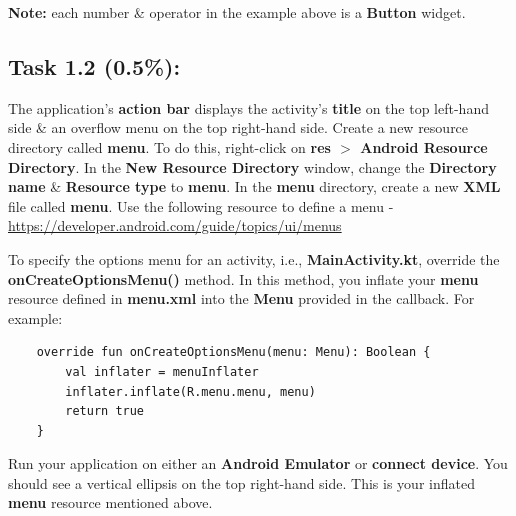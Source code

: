 \documentclass{article}
\begin{document}
\textbf{Note:} each number \& operator in the example above is a \textbf{Button} widget.

\subsection*{Task 1.2 (0.5\%):} 
The application's \textbf{action bar} displays the activity's \textbf{title} on the top left-hand side \& an overflow menu on the top right-hand side. Create a new resource directory called \textbf{menu}. To do this, right-click on \textbf{res $>$ Android Resource Directory}. In the \textbf{New Resource Directory} window, change the \textbf{Directory name} \& \textbf{Resource type} to \textbf{menu}. In the \textbf{menu} directory, create a new \textbf{XML} file called \textbf{menu}. Use the following resource to define a menu - \href{https://developer.android.com/guide/topics/ui/menus}{https://developer.android.com/guide/topics/ui/menus}

To specify the options menu for an activity, i.e., \textbf{MainActivity.kt}, override the \textbf{onCreateOptionsMenu()} method. In this method, you inflate your \textbf{menu} resource defined in \textbf{menu.xml} into the \textbf{Menu} provided in the callback. For example:

\begin{verbatim}
    override fun onCreateOptionsMenu(menu: Menu): Boolean {
        val inflater = menuInflater
        inflater.inflate(R.menu.menu, menu)
        return true
    }
\end{verbatim}

Run your application on either an \textbf{Android Emulator} or \textbf{connect device}. You should see a vertical ellipsis on the top right-hand side. This is your inflated \textbf{menu} resource mentioned above. \\
\end{document}
